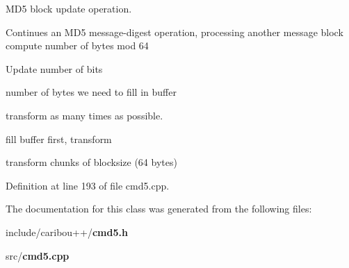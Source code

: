 M\-D5 block update operation. 

Continues an M\-D5 message-\/digest operation, processing another message block compute number of bytes mod 64

Update number of bits

number of bytes we need to fill in buffer

transform as many times as possible.

fill buffer first, transform

transform chunks of blocksize (64 bytes) 

Definition at line 193 of file cmd5.\-cpp.



The documentation for this class was generated from the following files\-:\begin{DoxyCompactItemize}
\item 
include/caribou++/{\bf cmd5.\-h}\item 
src/{\bf cmd5.\-cpp}\end{DoxyCompactItemize}
